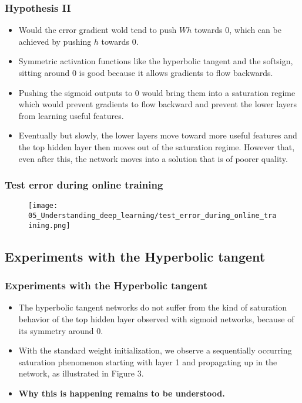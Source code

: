 \begin{frame}
  \frametitle{Hypothesis II}

  \begin{itemize}
    \item Would the error gradient wold tend to push $Wh$ towards 0, which can be achieved by pushing $h$ towards $0$. 
    
    \item  Symmetric activation functions like the hyperbolic tangent and the softsign, sitting around 0 is good because it allows gradients to flow backwards.
    
    \item Pushing the sigmoid outputs to 0 would bring them into a saturation regime which would prevent gradients to flow backward and prevent the lower layers from learning useful features. 
    
    \item Eventually but slowly, the lower layers move toward more useful features and the top hidden layer then moves out of the saturation regime. However that, even after this, the network moves into a solution that is of poorer quality. 
  \end{itemize}

\end{frame}


\begin{frame}
  \frametitle{Test error during online training}

  \begin{figure}[t]
    \centering
    \texttt{[image: 05\_Understanding\_deep\_learning/test\_error\_during\_online\_training.png]}
  \end{figure}
\end{frame}


\subsection{Experiments with the Hyperbolic tangent}

\begin{frame}
  \frametitle{Experiments with the Hyperbolic tangent}

  \begin{itemize}
    \item The hyperbolic tangent networks do not suffer from the kind of saturation behavior of the top hidden layer observed with sigmoid networks, because of its symmetry around 0.
    \item With the standard weight initialization, we observe a sequentially occurring saturation phenomenon starting with layer 1 and propagating up in the network, as illustrated in Figure 3. 
    \item \textbf{Why this is happening remains to be understood.}

  \end{itemize}

\end{frame}


